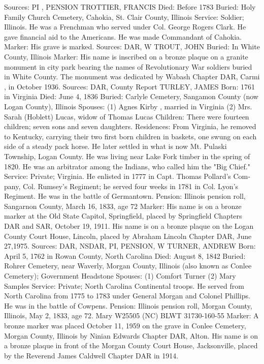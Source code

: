 Sources: PI , PENSION 
TROTTIER, FRANCIS
Died: Before 1783
Buried: Holy Family Church Cemetery, Cahokia, St. Clair County, Illinois
Service: Soldier; Illinois. He was a Frenchman who served under Col. George Rogers Clark. He gave financial aid to the Americans. He was made Com­mandant of Cahokia.
Marker: His grave is marked.
Sources: DAR, W 
TROUT, JOHN 
Buried: In White County, Illinois 
Marker: His name is inscribed on a bronze plaque on a granite monument in city park bearing the names of Revolutionary War soldiers buried in White County. The monument was dedicated by Wabash Chapter DAR, Carmi , in October 1936. 
Sources: DAR, County Report 
TURLEY, JAMES
Born: 1761 in Virginia 
Died: June 4, 1836 
Buried: Carlyle Cemetery, Sangamon County (now Logan County), Illinois 
Spouses: (1) Agnes Kirby , married in Virginia 
	 (2) Mrs. Sarah (Hoblett) Lucas, widow of Thomas Lucas Children: There were fourteen children; seven 
	       sons and seven daughters. 
Residences: From Virginia, he removed to Kentucky, carrying their two first born children in baskets, one swung on each side of a steady pack horse. He later settled in what is now Mt. Pulaski Township, Logan County. He was living near Lake Fork timber in the spring of 1820. He was an arbitrator among the Indians, who called him the "Big Chief." 
Service: Private; Virginia. He enlisted in 1777 in Capt. Thomas Pollard's Com­pany, Col. Rumsey's Regiment; he served four weeks in 1781 in Col. Lyon's Regiment. He was in the battle of Germantown. 
Pension: Illinois pension roll, Sangarnon County, March 16, 1833, age 72 
Marker: His name is on a bronze marker at the Old State Capitol, Springfield, placed by Springfield Chapters DAR and SAR, October 19, 1911. His name is on a bronze plaque on the Logan County Court House, Lincoln, placed by Abraham Lincoln Chapter DAR, June 27,1975. 
Sources: DAR, NSDAR, PI, PENSION, W 
TURNER, ANDREW
Born: April 5, 1762 in Rowan County, North Carolina
Died: August 8, 1842 
Buried: Rohrer Cemetery, near Waverly, Morgan County, Illinois (also known as Conlee Cemetery); Government Headstone 
Spouses: (1) Comfort Turner
	 (2) Mary Samples 
Service: Private; North Carolina Continental troops. He served from North Caro­lina from 1775 to 1783 under General Morgan and Colonel Phillips. He was in the battle of Cowpens. 
Pension: Illinois pension roll, Morgan County, Illinois, May 2, 1833, age 72. Mary W25505 (NC) BLWT 31730-160-55 
Marker: A bronze marker was placed October 11, 1959 on the grave in Conlee Cemetery, Morgan County, Illinois by Ninian Edwards Chapter DAR, Alton. His name is on a bronze plaque in front of the Morgan County Court House, Jacksonville, placed by the Reverend James Caldwell Chapter DAR in 1914. 
